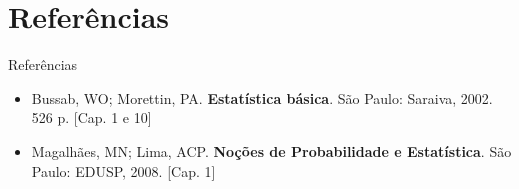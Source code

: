 \documentclass[10pt]{beamer}
\theoremstyle{definition}
\begin{document}
\section{Referências}

\begin{frame}{Referências}
  \begin{itemize}
  \item Bussab, WO; Morettin, PA. \textbf{Estatística básica}. São
    Paulo: Saraiva, 2002. 526 p. [Cap. 1 e 10]
  \item Magalhães, MN; Lima, ACP. \textbf{Noções de Probabilidade e
      Estatística}. São Paulo: EDUSP, 2008. [Cap. 1]
  \end{itemize}
\end{frame}
\end{document}
